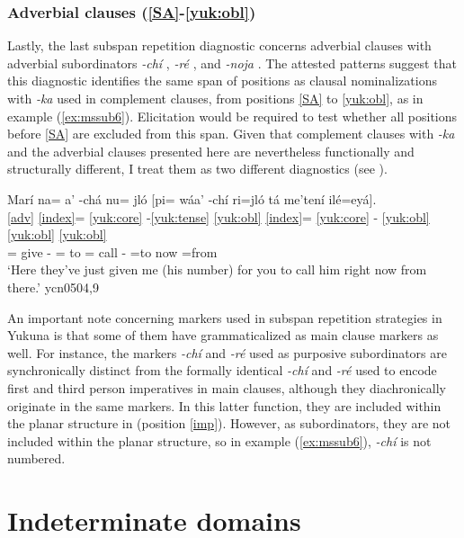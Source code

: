 \documentclass[output=paper]{langscibook}
\begin{document}
\subsubsection{Adverbial clauses (\ref{SA}-\ref{yuk:obl})}
Lastly, the last subspan repetition diagnostic concerns adverbial clauses with adverbial subordinators \textit{-chí} \Purp{}, \textit{-ré} \Purp{}, and \textit{-noja} \Conc{}. The attested patterns suggest that this diagnostic identifies the same span of positions as clausal nominalizations with \textit{-ka} used in complement clauses, from positions \ref{SA} to \ref{yuk:obl}, as in example (\ref{ex:mssub6}). Elicitation would be required to test whether all positions before \ref{SA} are excluded from this span. Given that complement clauses with \textit{-ka} and the adverbial clauses presented here are nevertheless functionally and structurally different, I treat them as two different diagnostics (see \citealt[][115--123]{lemus2020}).

\ea \label{ex:mssub6}
    \glll  Marí na= a' -chá nu= jló [pi= wáa' -chí ri=jló tá me'tení ilé=eyá].\\
       \ref{adv} \ref{index}= \ref{yuk:core} -\ref{yuk:tense} \ref{yuk:obl} {} \ref{index}= \ref{yuk:core} - \ref{yuk:obl} {} \ref{yuk:obl} \ref{yuk:obl} \\
        \Prox{} \Tpl{}= give -\Pst{} \Fsg{}= to \Ssg{}= call -\Purp{} \Tsg{}=to \Emph{} now \Med{}=from \\
    \glt `Here they've just given me (his number) for you to call him right now from there.' \hfill ycn0504,9
 \z
 
An important note concerning markers used in subspan repetition strategies in Yukuna is that some of them have grammaticalized as main clause markers as well. For instance, the markers  \textit{-chí} and \textit{-ré} used as purposive subordinators are synchronically distinct from the formally identical \textit{-chí} and \textit{-ré} used to encode first and third person imperatives in main clauses, although they diachronically originate in the same markers. In this latter function, they are included within the planar structure in  (position \ref{imp}). However, as subordinators, they are not included within the planar structure, so in example (\ref{ex:mssub6}), \textit{-chí} is not numbered.

\section{Indeterminate domains}
\label{sec:inddomains}
\end{document}
